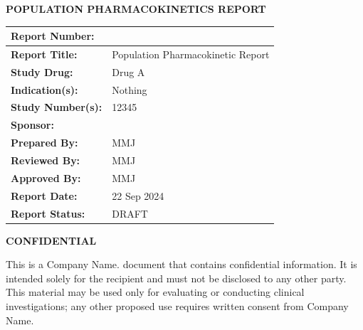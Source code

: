 \documentclass[
  letterpaper,
  toc=chapterentrywithdots,
  11pt,
  headings=small]{scrreprt}
\renewcommand*\contentsname{Table of contents}
\newcommand\contentsname{Table of contents}
\begin{document}
\thispagestyle{empty}
\vskip2cm
{\centerline{\textbf{POPULATION PHARMACOKINETICS REPORT}}}
\vskip1cm
\begin{table}[!h]
      \setlength{\tabcolsep}{5pt}
      \renewcommand{\arraystretch}{1.5}
      \begin{tabularx}{\textwidth}{|p{}|X|}
            \hline
            \textbf{Report Number:} & \\
            \hline
            \textbf{Report Title:} & Population Pharmacokinetic
Report \\
            \hline
            \textbf{Study Drug:} &  Drug A\\
            \hline
            \textbf{Indication(s):} & Nothing\\
            \hline
            \textbf{Study Number(s):} & 12345\\
            \hline
            \textbf{Sponsor:} & \\
            \hline
            \textbf{Prepared By:} & MMJ\\
            \hline
            \textbf{Reviewed By:} & MMJ \\
            \hline
            \textbf{Approved By:} & MMJ\\
            \hline
            \textbf{Report Date:} & 22 Sep 2024\\
            \hline
            \textbf{Report Status:}  & DRAFT\\
            \hline
      \end{tabularx}
\end{table}
\vskip0.5cm
\begin{center}
{\textbf{CONFIDENTIAL}}
\begin{mdframed}
    {\normalsize This is a Company Name. document that contains
confidential information. It is intended solely for the recipient and
must not be disclosed to any other party. This material may be used only
for evaluating or conducting clinical investigations; any other proposed
use requires written consent from Company Name.}
\end{mdframed}
\end{center}

\renewcommand*\contentsname{Contents}
{
\hypersetup{linkcolor=blue}
\setcounter{tocdepth}{2}
\tableofcontents
}
\listoffigures
\listoftables


\chapter{}\label{section}
\end{document}
